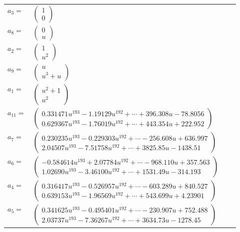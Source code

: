 \documentclass[1p]{elsarticle_modified}
\theoremstyle{definition}
\begin{document}
\begin{tabular}{m{7pt} m{180pt} m{7pt} m{180pt} }
\flushright $a_{3}=$&$\begin{pmatrix}1\\0\end{pmatrix}$ \\
\flushright $a_{8}=$&$\begin{pmatrix}0\\u\end{pmatrix}$ \\
\flushright $a_{2}=$&$\begin{pmatrix}1\\u^2\end{pmatrix}$ \\
\flushright $a_{9}=$&$\begin{pmatrix}u\\u^3+u\end{pmatrix}$ \\
\flushright $a_{1}=$&$\begin{pmatrix}u^2+1\\u^2\end{pmatrix}$ \\
\flushright $a_{11}=$&$\begin{pmatrix}0.331471 u^{193}-1.19129 u^{192}+\cdots+396.308 u-78.8056\\0.629367 u^{193}-1.76019 u^{192}+\cdots+443.354 u+222.952\end{pmatrix}$ \\
\flushright $a_{7}=$&$\begin{pmatrix}0.230235 u^{193}-0.229303 u^{192}+\cdots-256.608 u+636.997\\2.04507 u^{193}-7.51758 u^{192}+\cdots+3825.85 u-1438.51\end{pmatrix}$ \\
\flushright $a_{6}=$&$\begin{pmatrix}-0.584614 u^{193}+2.07784 u^{192}+\cdots-968.110 u+357.563\\1.02690 u^{193}-3.46100 u^{192}+\cdots+1531.49 u-314.193\end{pmatrix}$ \\
\flushright $a_{4}=$&$\begin{pmatrix}0.316417 u^{193}-0.526957 u^{192}+\cdots-603.289 u+840.527\\0.639153 u^{193}-1.96569 u^{192}+\cdots+543.699 u+4.23901\end{pmatrix}$ \\
\flushright $a_{5}=$&$\begin{pmatrix}0.341625 u^{193}-0.495401 u^{192}+\cdots-230.907 u+752.488\\2.03737 u^{193}-7.36267 u^{192}+\cdots+3634.73 u-1278.45\end{pmatrix}$ \\

\end{tabular}
\end{document}
